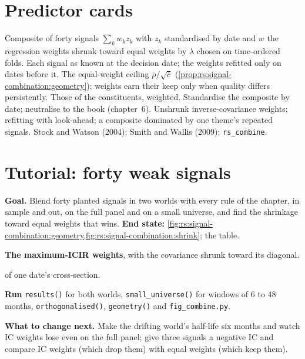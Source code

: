 \section{Predictor cards}

\begin{predictorcard}{Composite of forty signals}\label{pred:rs:signal-combination:composite}
 $\sum_k w_k z_k$ with $z_k$ standardised by date and $w$ the regression weights shrunk toward equal weights by $\lambda$ chosen on
time-ordered folds.
 Each signal as known at the decision date; the weights refitted only on dates before it.
 The equal-weight ceiling $\bar\rho/\sqrt{\bar c}$ (\cref{prop:rs:signal-combination:geometry}); weights earn their keep only when
quality differs persistently.
 Those of the constituents, weighted.
 Standardise the composite by date; neutralise to the book (chapter~6).
 Unshrunk inverse-covariance weights; refitting with look-ahead; a composite dominated by one theme's repeated signals.
 Stock and Watson (2004); Smith and Wallis (2009); \texttt{rs\_combine}.
\end{predictorcard}

\section{Tutorial: forty weak signals}\label{tut:rs:signal-combination:tut}

\begin{tutorial}
\textbf{Goal.} Blend forty planted signals in two worlds with every rule of the chapter, in sample and out, on the full panel and on a small
universe, and find the shrinkage toward equal weights that wins. \textbf{End state:}
\cref{fig:rs:signal-combination:geometry,fig:rs:signal-combination:shrink}; the table.
\begin{tutsteps}
\item \textbf{The maximum-ICIR weights}, with the covariance shrunk toward its diagonal.
\label{lst:rs:signal-combination:icir}
\item \textbf{} of one date's cross-section.
\label{lst:rs:signal-combination:sym}
\item \textbf{Run} \texttt{results()} for both worlds, \texttt{small\_universe()} for windows of 6 to 48 months, \texttt{orthogonalised()},
\texttt{geometry()} and \texttt{fig\_combine.py}.
\end{tutsteps}
\textbf{What to change next.} Make the drifting world's half-life six months and watch IC weights lose even on the full panel; give three
signals a negative IC and compare IC weights (which drop them) with equal weights (which keep them).
\end{tutorial}

